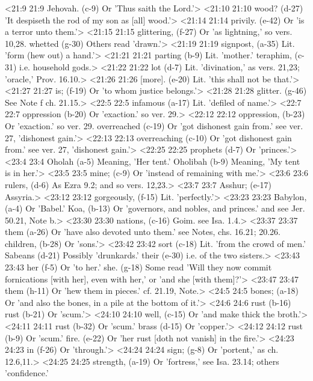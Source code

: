 <21:9 21:9  Jehovah. (c-9)  Or 'Thus saith the Lord.'>
<21:10 21:10  wood? (d-27)  'It despiseth the rod of my son as [all] wood.'>
<21:14 21:14  privily. (e-42)  Or 'is a terror unto them.'>
<21:15 21:15  glittering, (f-27)  Or 'as lightning,' so vers. 10,28.
  whetted (g-30)  Others read 'drawn.'>
<21:19 21:19  signpost, (a-35)  Lit. 'form (hew out) a hand.'>
<21:21 21:21  parting (b-9)  Lit. 'mother.'
  teraphim, (c-31)  i.e. household gods.>
<21:22 21:22  lot (d-7)  Lit. 'divination,' as vers. 21,23; 'oracle,' Prov. 16.10.>
<21:26 21:26  [more]. (e-20)  Lit. 'this shall not be that.'>
<21:27 21:27  is; (f-19)  Or 'to whom justice belongs.'>
<21:28 21:28  glitter. (g-46)  See Note f ch. 21.15.>
<22:5 22:5  infamous (a-17)  Lit. 'defiled of name.'>
<22:7 22:7  oppression (b-20) Or 'exaction.' so ver. 29.>
<22:12 22:12  oppression, (b-23)  Or 'exaction.' so ver. 29.
  overreached (c-19) Or 'got dishonest gain from.' see ver. 27, 'dishonest gain.'>
<22:13 22:13  overreaching (c-10)  Or 'got dishonest gain from.' see ver. 27, 'dishonest gain.'>
<22:25 22:25  prophets (d-7)  Or 'princes.'>
<23:4 23:4  Oholah (a-5)  Meaning, 'Her tent.'
  Oholibah (b-9)  Meaning, 'My tent is in her.'>
<23:5 23:5  mine; (c-9)  Or 'instead of remaining with me.'>
<23:6 23:6  rulers, (d-6)  As Ezra 9.2; and so vers. 12,23.>
<23:7 23:7  Asshur; (e-17)  Assyria.>
<23:12 23:12  gorgeously, (f-15)  Lit. 'perfectly.'>
<23:23 23:23  Babylon, (a-4)  Or 'Babel.'
  Koa, (b-13)  Or 'governors, and nobles, and princes.' and see Jer. 50.21,  Note b.>
<23:30 23:30  nations, (c-16)  Goim. see Isa. 1.4.>
<23:37 23:37  them (a-26)  Or 'have also devoted unto them.' see Notes, chs. 16.21; 20.26.
  children, (b-28)  Or 'sons.'>
<23:42 23:42  sort (c-18)  Lit. 'from the crowd of men.'
  Sabeans (d-21)  Possibly 'drunkards.'
  their (e-30)  i.e. of the two sisters.>
<23:43 23:43  her (f-5)  Or 'to her.'
  she. (g-18)  Some read 'Will they now commit fornications [with her], even  with her,' or 'and she [with them]?'>
<23:47 23:47  them (h-11)  Or 'hew them in pieces.' cf. 21.19, Note.>
<24:5 24:5  bones; (a-18)  Or 'and also the bones, in a pile at the bottom of it.'>
<24:6 24:6  rust (b-16)  rust (b-21)
 Or 'scum.'>
<24:10 24:10  well, (c-15)  Or 'and make thick the broth.'>
<24:11 24:11  rust (b-32) Or 'scum.'
  brass (d-15)  Or 'copper.'>
<24:12 24:12  rust (b-9)  Or 'scum.'
  fire. (e-22)  Or 'her rust [doth not vanish] in the fire.'>
<24:23 24:23  in (f-26)  Or 'through.'>
<24:24 24:24  sign; (g-8)  Or 'portent,' as ch. 12.6,11.>
<24:25 24:25  strength, (a-19)  Or 'fortress,' see Isa. 23.14; others 'confidence.'
